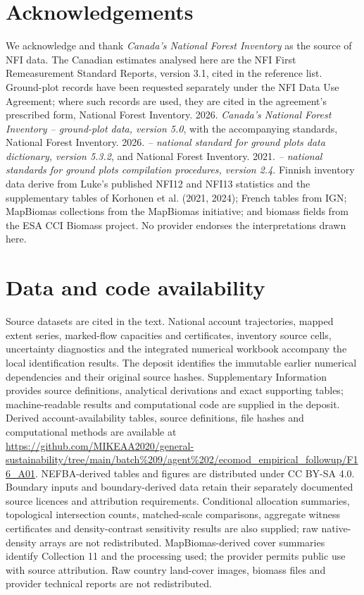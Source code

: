 \documentclass[11pt,a4paper]{article}
\begin{document}
\section*{Acknowledgements}
We acknowledge and thank \emph{Canada's National Forest Inventory} as the source of NFI data. The Canadian estimates analysed here are the NFI First Remeasurement Standard Reports, version 3.1, cited in the reference list. Ground-plot records have been requested separately under the NFI Data Use Agreement; where such records are used, they are cited in the agreement's prescribed form, National Forest Inventory. 2026. \emph{Canada's National Forest Inventory -- ground-plot data, version 5.0}, with the accompanying standards, National Forest Inventory. 2026. \emph{-- national standard for ground plots data dictionary, version 5.3.2}, and National Forest Inventory. 2021. \emph{-- national standards for ground plots compilation procedures, version 2.4}. Finnish inventory data derive from Luke's published NFI12 and NFI13 statistics and the supplementary tables of Korhonen et al. (2021, 2024); French tables from IGN; MapBiomas collections from the MapBiomas initiative; and biomass fields from the ESA CCI Biomass project. No provider endorses the interpretations drawn here.

\section*{Data and code availability}
Source datasets are cited in the text. National account trajectories, mapped extent series, marked-flow capacities and certificates, inventory source cells, uncertainty diagnostics and the integrated numerical workbook accompany the local identification results. The deposit identifies the immutable earlier numerical dependencies and their original source hashes. Supplementary Information provides source definitions, analytical derivations and exact supporting tables; machine-readable results and computational code are supplied in the deposit. Derived account-availability tables, source definitions, file hashes and computational methods are available at \url{https://github.com/MIKEAA2020/general-sustainability/tree/main/batch%209/agent%202/ecomod_empirical_followup/F16_A01}. NEFBA-derived tables and figures are distributed under CC BY-SA 4.0. Boundary inputs and boundary-derived data retain their separately documented source licences and attribution requirements. Conditional allocation summaries, topological intersection counts, matched-scale comparisons, aggregate witness certificates and density-contrast sensitivity results are also supplied; raw native-density arrays are not redistributed. MapBiomas-derived cover summaries identify Collection 11 and the processing used; the provider permits public use with source attribution. Raw country land-cover images, biomass files and provider technical reports are not redistributed.
\end{document}
